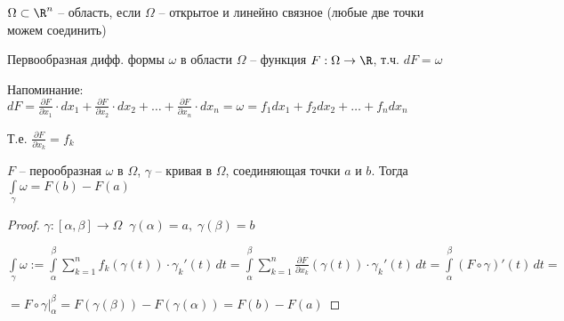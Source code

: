 
\begin{definition}\thmslashn
	
	$\Omega \subset \R^n$ -- область, если $\Omega$ -- открытое и линейно связное (любые две точки можем соединить) 
	
\end{definition}


\begin{definition}\thmslashn
	
	Первообразная дифф. формы $\omega$ в области $\Omega$ -- функция $F: \Omega \to \R$, т.ч. $dF = \omega$
	
\end{definition}

Напоминание: $dF = \frac{\partial F}{\partial x_1} \cdot dx_1 + \frac{\partial F}{\partial x_2} \cdot dx_2 + \ldots + \frac{\partial F}{\partial x_n} \cdot dx_n = \omega =  f_1 dx_1 + f_2dx_2 + \ldots + f_ndx_n$

Т.е. $\frac{\partial F}{\partial x_k} = f_k$

\begin{theorem}\thmslashn
	
	$F$ -- перообразная $\omega$ в $\Omega$, $\gamma$ -- кривая в $\Omega$, соединяющая точки $a$ и $b$. Тогда $\int\limits_{\gamma}\omega = F(b) - F(a)$
	
\end{theorem}

\begin{proof}\thmslashn
	
	$\gamma:[\alpha, \beta]\to\Omega\;\; \gamma(\alpha) = a, \;\gamma(\beta) = b$
	
	$\int\limits_\gamma \omega := \int\limits_\alpha^\beta  \sum\limits_{k=1}^n f_k(\gamma(t)) \cdot \gamma_k'(t)\,dt = \int\limits_\alpha^\beta  \sum\limits_{k=1}^n \frac{\partial F}{\partial x_k} (\gamma(t)) \cdot \gamma_k'(t)\,dt = \int\limits_\alpha^\beta \left( F\circ \gamma \right)'(t)\,dt = $
	
	$= F\circ \gamma \Big|_\alpha^\beta = F(\gamma(\beta)) - F(\gamma(\alpha)) = F(b) - F(a)$
	
\end{proof}

